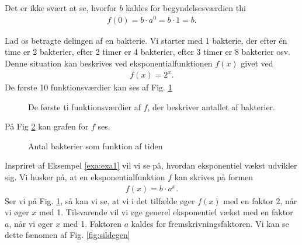 Det er ikke svært at se, hvorfor $b$ kaldes for begyndelsesværdien thi
\begin{align*}
	f(0) = b\cdot a^0 = b\cdot 1 = b.
\end{align*}

\begin{exa}\label{exa:exa1}
Lad os betragte delingen af en bakterie. Vi starter med 1 bakterie, der efter én time er 2 bakterier, efter 2 timer er 4 bakterier, efter 3 timer er 8 bakterier osv. Denne situation kan beskrives ved eksponentialfunktionen $f(x)$ givet ved
\begin{align*}
f(x) = 2^x.
\end{align*}
De første 10 funktionsværdier kan ses af Fig. \ref{fig:sildebenfold}
\begin{figure}[H]
\center
{}
\caption{De første ti funktionsværdier af $f$, der beskriver antallet af bakterier. }
\label{fig:sildebenfold}
\end{figure}
På Fig \ref{fig:flagxfold} kan grafen for $f$ ses. 
\begin{figure}[H]
\center
{}
\caption{Antal bakterier som funktion af tiden}
\label{fig:flagxfold}
\end{figure}
\end{exa}
Inspriret af Eksempel \ref{exa:exa1} vil vi se på, hvordan eksponentiel vækst udvikler sig. Vi husker på, at en eksponentialfunktion $f$ kan skrives på formen
\begin{align*}
f(x) = b\cdot a^x.
\end{align*}
Ser vi på Fig. \ref{fig:sildebenfold}, så kan vi se, at vi i det tilfælde øger $f(x)$ med en faktor $2$, når vi øger $x$ med 1. Tilsvarende vil vi øge generel eksponentiel vækst med en faktor $a$, når vi øger $x$ med 1. Faktoren $a$ kaldes for fremskrivningsfaktoren. Vi kan se dette fænomen af Fig. \ref{fig:sildegen}
